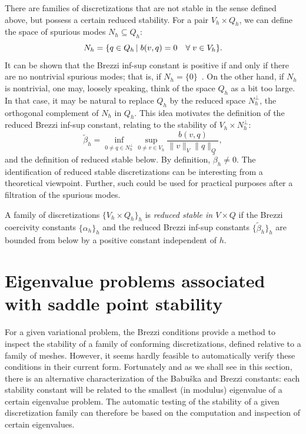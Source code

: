 There are families of discretizations that are not stable in the sense
defined above, but possess a certain reduced stability. For a pair
$V_h \times Q_h$, we can define the space of spurious modes $N_h
\subseteq Q_h$:
\begin{equation*}
  N_h
  = \{q \in Q_h \, | \; b(v, q) = 0 \quad
  \forall \; v \in V_h\}.
\end{equation*}
It can be shown that the Brezzi inf-sup constant is positive if and
only if there are no nontrivial spurious modes; that is, if $N_h = \{
0 \}$~\cite{Qin1994}.  On the other hand, if $N_h$ is
nontrivial, one may, loosely speaking, think of the space $Q_h$ as a
bit too large.  In that case, it may be natural to replace $Q_h$ by
the reduced space $N_h^{\perp}$, the orthogonal complement of $N_h$ in
$Q_h$. This idea motivates the definition of the reduced Brezzi
inf-sup constant, relating to the stability of $V_h \times
N_h^{\perp}$:
\begin{equation}
  \label{rognes:eq:reduced:infsup}
  \tilde \beta_h =
  \inf_{0 \not = q \in N_h^{\perp}}
  \sup_{0 \not = v \in V_h}
  \frac{b(v, q)}
       {\|v\|_{V} \|q\|_{Q}},
\end{equation}
and the definition of reduced stable below. By definition, $\tilde
\beta_h \not = 0$. The identification of reduced stable
discretizations can be interesting from a theoretical
viewpoint. Further, such could be used for practical purposes after a
filtration of the spurious modes.
\begin{definition}
  \label{rognes:def:reduced_stable}
  A family of discretizations $\{V_h \times Q_h\}_h$ is \emph{reduced
    stable in $V \times Q$} if the Brezzi coercivity constants
  $\{\alpha_h\}_h$ and the reduced Brezzi inf-sup constants $\{ \tilde
  \beta_h \}_h$ are bounded from below by a positive constant
  independent of $h$.
\end{definition}


\section{Eigenvalue problems associated with saddle point stability}

For a given variational problem, the Brezzi conditions provide a
method to inspect the stability of a family of conforming
discretizations, defined relative to a family of meshes. However, it
seems hardly feasible to automatically verify these conditions in
their current form. Fortunately and as we shall see in this section,
there is an alternative characterization of the Babu\v ska and Brezzi
constants: each stability constant will be related to the smallest (in
modulus) eigenvalue of a certain eigenvalue problem. The automatic
testing of the stability of a given discretization family can
therefore be based on the computation and inspection of certain
eigenvalues.

